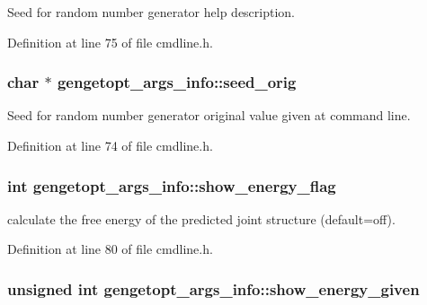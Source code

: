 Seed for random number generator help description. 



Definition at line 75 of file cmdline.\+h.

\hypertarget{structgengetopt__args__info_a9b36d9a37ede1d3c6cca9d13a45c3cae}{
\subsubsection[{seed\+\_\+orig}]{\setlength{\rightskip}{0pt plus 5cm}char $\ast$ gengetopt\+\_\+args\+\_\+info\+::seed\+\_\+orig}}\label{structgengetopt__args__info_a9b36d9a37ede1d3c6cca9d13a45c3cae}


Seed for random number generator original value given at command line. 



Definition at line 74 of file cmdline.\+h.

\hypertarget{structgengetopt__args__info_a53618c4b58a0f0c1ebc48f773878ae03}{
\subsubsection[{show\+\_\+energy\+\_\+flag}]{\setlength{\rightskip}{0pt plus 5cm}int gengetopt\+\_\+args\+\_\+info\+::show\+\_\+energy\+\_\+flag}}\label{structgengetopt__args__info_a53618c4b58a0f0c1ebc48f773878ae03}


calculate the free energy of the predicted joint structure (default=off). 



Definition at line 80 of file cmdline.\+h.

\hypertarget{structgengetopt__args__info_a0d4a4466189dbba0719c55a398fb30fa}{
\subsubsection[{show\+\_\+energy\+\_\+given}]{\setlength{\rightskip}{0pt plus 5cm}unsigned int gengetopt\+\_\+args\+\_\+info\+::show\+\_\+energy\+\_\+given}}\label{structgengetopt__args__info_a0d4a4466189dbba0719c55a398fb30fa}


